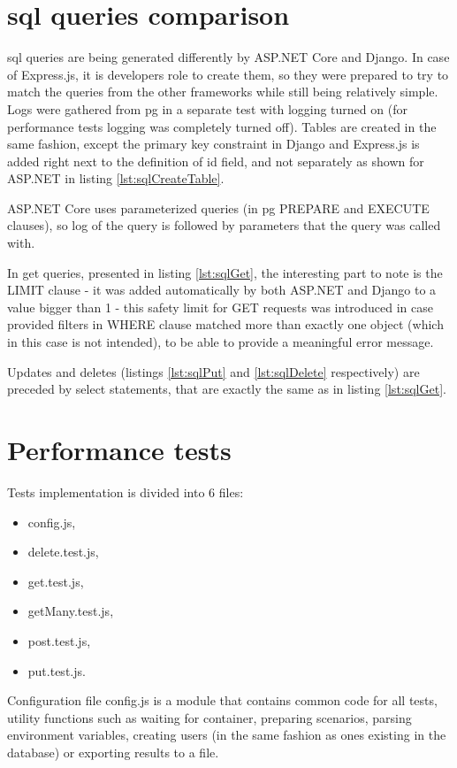 \section{\acrshort{sql} queries comparison}
\acrshort{sql} queries are being generated differently by ASP.NET Core and Django. In case of Express.js, it is developers role to create them, so they were prepared to try to match the queries from the other frameworks while still being relatively simple. Logs were gathered from \acrlong{pg} in a separate test with logging turned on (for performance tests logging was completely turned off).
Tables are created in the same fashion, except the primary key constraint in Django and Express.js is added right next to the definition of id field, and not separately as shown for ASP.NET in listing \ref{lst:sqlCreateTable}.

ASP.NET Core uses parameterized queries (in \acrlong{pg} PREPARE and EXECUTE clauses), so log of the query is followed by parameters that the query was called with.

In get queries, presented in listing \ref{lst:sqlGet}, the interesting part to note is the LIMIT clause - it was added automatically by both ASP.NET and Django to a value bigger than 1 - this safety limit for GET requests was introduced in case provided filters in WHERE clause matched more than exactly one object (which in this case is not intended), to be able to provide a meaningful error message.

Updates and deletes (listings \ref{lst:sqlPut} and \ref{lst:sqlDelete} respectively) are preceded by select statements, that are exactly the same as in listing \ref{lst:sqlGet}.






%
%
\section{Performance tests}
Tests implementation is divided into 6 files:
\begin{itemize}
    \item config.js,
    \item delete.test.js,
    \item get.test.js,
    \item getMany.test.js,
    \item post.test.js,
    \item put.test.js.
\end{itemize}
Configuration file config.js is a module that contains common code for all tests, utility functions such as waiting for container, preparing scenarios, parsing environment variables, creating users (in the same fashion as ones existing in the database) or exporting results to a file.


